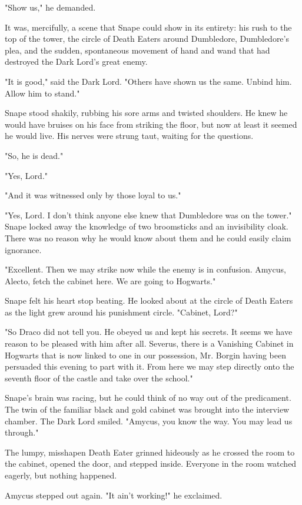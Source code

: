 "Show us," he demanded.

It was, mercifully, a scene that Snape could show in its entirety: his rush to the top of the tower, the circle of Death Eaters around Dumbledore, Dumbledore's plea, and the sudden, spontaneous movement of hand and wand that had destroyed the Dark Lord's great enemy.

"It is good," said the Dark Lord. "Others have shown us the same. Unbind him. Allow him to stand."

Snape stood shakily, rubbing his sore arms and twisted shoulders. He knew he would have bruises on his face from striking the floor, but now at least it seemed he would live. His nerves were strung taut, waiting for the questions.

"So, he is dead."

"Yes, Lord."

"And it was witnessed only by those loyal to us."

"Yes, Lord. I don't think anyone else knew that Dumbledore was on the tower." Snape locked away the knowledge of two broomsticks and an invisibility cloak. There was no reason why he would know about them and he could easily claim ignorance.

"Excellent. Then we may strike now while the enemy is in confusion. Amycus, Alecto, fetch the cabinet here. We are going to Hogwarts."

Snape felt his heart stop beating. He looked about at the circle of Death Eaters as the light grew around his punishment circle. "Cabinet, Lord?"

"So Draco did not tell you. He obeyed us and kept his secrets. It seems we have reason to be pleased with him after all. Severus, there is a Vanishing Cabinet in Hogwarts that is now linked to one in our possession, Mr. Borgin having been persuaded this evening to part with it. From here we may step directly onto the seventh floor of the castle and take over the school."

Snape's brain was racing, but he could think of no way out of the predicament. The twin of the familiar black and gold cabinet was brought into the interview chamber. The Dark Lord smiled. "Amycus, you know the way. You may lead us through."

The lumpy, misshapen Death Eater grinned hideously as he crossed the room to the cabinet, opened the door, and stepped inside. Everyone in the room watched eagerly, but nothing happened.

Amycus stepped out again. "It ain't working!" he exclaimed.

